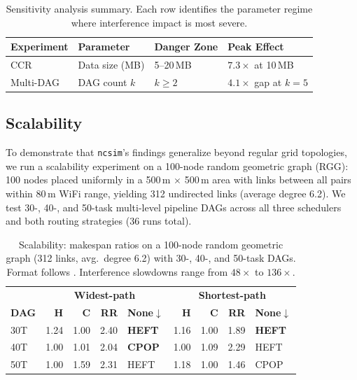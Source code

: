 \documentclass[conference]{IEEEtran}
\newcommand{\ncsim}{\texttt{ncsim}}
\begin{document}
\begin{table}[t]
\centering
\caption{Sensitivity analysis summary.  Each row identifies the
parameter regime where interference impact is most severe.}
\label{tab:sensitivity_summary}
\begin{tabular}{@{}llll@{}}
\toprule
\textbf{Experiment} & \textbf{Parameter} & \textbf{Danger Zone} & \textbf{Peak Effect} \\
\midrule
CCR         & Data size (MB)  & 5--20\,MB          & $7.3\times$ at 10\,MB \\
Multi-DAG   & DAG count $k$   & $k \geq 2$        & $4.1\times$ gap at $k{=}5$ \\
\bottomrule
\end{tabular}
\end{table}


\subsection{Scalability}
\label{sec:scalability}

To demonstrate that \ncsim{}'s findings generalize beyond regular grid
topologies, we run a scalability experiment on a 100-node random geometric
graph (RGG): 100 nodes placed uniformly in a 500\,m $\times$ 500\,m area
with links between all pairs within 80\,m WiFi range, yielding 312
undirected links (average degree 6.2).  We test 30-, 40-, and 50-task
multi-level pipeline DAGs across all three schedulers and both routing
strategies (36 runs total).

\begin{table}[t]
\centering
\caption{Scalability: makespan ratios on a 100-node random geometric
  graph (312 links, avg.\ degree 6.2) with 30-, 40-, and 50-task DAGs.
  Format follows .  Interference slowdowns
  range from $48\times$ to $136\times$.}
\label{tab:scalability_rgg}
\setlength{\tabcolsep}{3pt}
\begin{tabular}{@{}l|rrrl|rrrl@{}}
\toprule
& \multicolumn{4}{c|}{\textbf{Widest-path}} &
  \multicolumn{4}{c}{\textbf{Shortest-path}} \\
\textbf{DAG} &
  \textbf{H} & \textbf{C} & \textbf{RR} & \textbf{None$\downarrow$} &
  \textbf{H} & \textbf{C} & \textbf{RR} & \textbf{None$\downarrow$} \\
\midrule
30T & 1.24 & 1.00 & 2.40 & \textbf{HEFT} & 1.16 & 1.00 & 1.89 & \textbf{HEFT} \\
40T & 1.00 & 1.01 & 2.04 & \textbf{CPOP} & 1.00 & 1.09 & 2.29 & HEFT \\
50T & 1.00 & 1.59 & 2.31 & HEFT          & 1.18 & 1.00 & 1.46 & CPOP \\
\bottomrule
\end{tabular}
\end{table}
\end{document}
